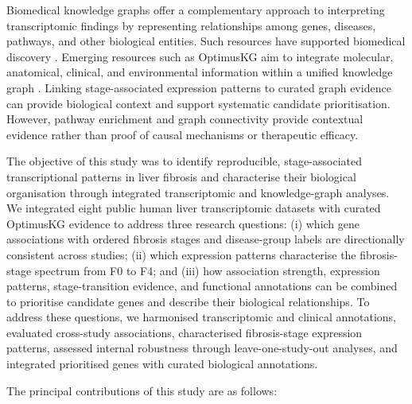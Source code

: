 \documentclass[11pt,a4paper]{article}
\begin{document}
Biomedical knowledge graphs offer a complementary approach to interpreting transcriptomic findings by representing relationships among genes, diseases, pathways, and other biological entities. Such resources have supported biomedical discovery \cite{himmelstein2017}. Emerging resources such as OptimusKG aim to integrate molecular, anatomical, clinical, and environmental information within a unified knowledge graph \cite{ref5}. Linking stage-associated expression patterns to curated graph evidence can provide biological context and support systematic candidate prioritisation. However, pathway enrichment and graph connectivity provide contextual evidence rather than proof of causal mechanisms or therapeutic efficacy.

The objective of this study was to identify reproducible, stage-associated transcriptional patterns in liver fibrosis and characterise their biological organisation through integrated transcriptomic and knowledge-graph analyses. We integrated eight public human liver transcriptomic datasets with curated OptimusKG evidence to address three research questions: (i) which gene associations with ordered fibrosis stages and disease-group labels are directionally consistent across studies; (ii) which expression patterns characterise the fibrosis-stage spectrum from F0 to F4; and (iii) how association strength, expression patterns, stage-transition evidence, and functional annotations can be combined to prioritise candidate genes and describe their biological relationships. To address these questions, we harmonised transcriptomic and clinical annotations, evaluated cross-study associations, characterised fibrosis-stage expression patterns, assessed internal robustness through leave-one-study-out analyses, and integrated prioritised genes with curated biological annotations.

The principal contributions of this study are as follows:
\end{document}
